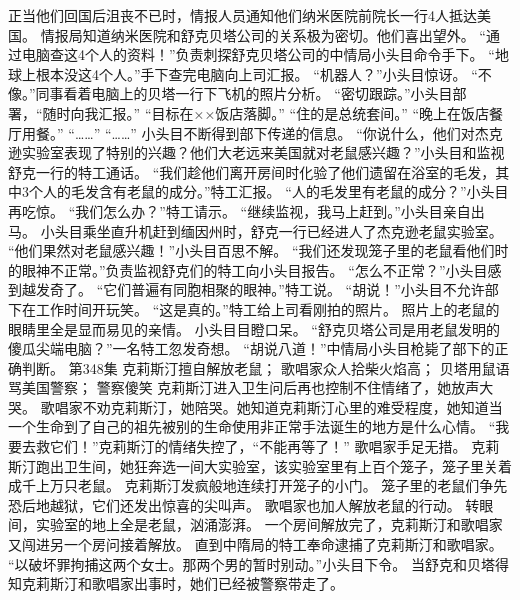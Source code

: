 \documentclass[a4paper,12pt,UTF8,twoside]{ctexbook}
\begin{document}
        正当他们回国后沮丧不已时，情报人员通知他们纳米医院前院长一行4人抵达美国。  
        情报局知道纳米医院和舒克贝塔公司的关系极为密切。他们喜出望外。  
        “通过电脑查这4个人的资料！”负责刺探舒克贝塔公司的中情局小头目命令手下。  
        “地球上根本没这4个人。”手下查完电脑向上司汇报。        
        “机器人？”小头目惊讶。  
        “不像。”同事看着电脑上的贝塔一行下飞机的照片分析。  
        “密切跟踪。”小头目部署，“随时向我汇报。”  
        “目标在××饭店落脚。”  
        “住的是总统套间。”  
        “晚上在饭店餐厅用餐。”  
        “……”  
        “……”  
        小头目不断得到部下传递的信息。  
        “你说什么，他们对杰克逊实验室表现了特别的兴趣？他们大老远来美国就对老鼠感兴趣？”小头目和监视舒克一行的特工通话。  
        “我们趁他们离开房间时化验了他们遗留在浴室的毛发，其中3个人的毛发含有老鼠的成分。”特工汇报。  
        “人的毛发里有老鼠的成分？”小头目再吃惊。  
        “我们怎么办？”特工请示。  
        “继续监视，我马上赶到。”小头目亲自出马。  
        小头目乘坐直升机赶到缅因州时，舒克一行已经进人了杰克逊老鼠实验室。  
        “他们果然对老鼠感兴趣！”小头目百思不解。  
        “我们还发现笼子里的老鼠看他们时的眼神不正常。”负责监视舒克们的特工向小头目报告。        
        “怎么不正常？”小头目感到越发奇了。  
        “它们普遍有同胞相聚的眼神。”特工说。  
        “胡说！”小头目不允许部下在工作时间开玩笑。  
        “这是真的。”特工给上司看刚拍的照片。  
        照片上的老鼠的眼睛里全是显而易见的亲情。  
        小头目目瞪口呆。  
        “舒克贝塔公司是用老鼠发明的傻瓜尖端电脑？”一名特工忽发奇想。  
        “胡说八道！”中情局小头目枪毙了部下的正确判断。          第348集  
        克莉斯汀擅自解放老鼠；  
        歌唱家众人拾柴火焰高；  
        贝塔用鼠语骂美国警察；  
        警察傻笑   
        克莉斯汀进入卫生问后再也控制不住情绪了，她放声大哭。  
        歌唱家不劝克莉斯汀，她陪哭。她知道克莉斯汀心里的难受程度，她知道当一个生命到了自己的祖先被别的生命使用非正常手法诞生的地方是什么心情。  
        “我要去救它们！”克莉斯汀的情绪失控了，“不能再等了！”  
        歌唱家手足无措。  
        克莉斯汀跑出卫生间，她狂奔选一间大实验室，该实验室里有上百个笼子，笼子里关着成千上万只老鼠。        
        克莉斯汀发疯般地连续打开笼子的小门。  
        笼子里的老鼠们争先恐后地越狱，它们还发出惊喜的尖叫声。  
        歌唱家也加人解放老鼠的行动。  
        转眼间，实验室的地上全是老鼠，汹涌澎湃。  
        一个房间解放完了，克莉斯汀和歌唱家又闯进另一个房问接着解放。  
        直到中隋局的特工奉命逮捕了克莉斯汀和歌唱家。  
        “以破坏罪拘捕这两个女士。那两个男的暂时别动。”小头目下令。  
        当舒克和贝塔得知克莉斯汀和歌唱家出事时，她们已经被警察带走了。  
\end{document}
